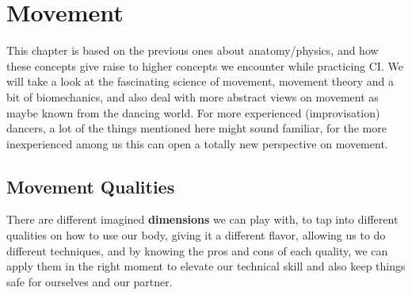 \chapter{Movement}\label{ch:movement}


This chapter is based on the previous ones about anatomy/physics, and how these concepts give raise to higher concepts we encounter while practicing CI\@.
We will take a look at the fascinating science of movement, movement theory and a bit of biomechanics, and also deal with more abstract views on movement as maybe known from the dancing world.
For more experienced (improvisation) dancers, a lot of the things mentioned here might sound familiar, for the more inexperienced among us this can open a totally new perspective on movement.

\section{Movement Qualities}\label{sec:movement-qualities}

There are different imagined \textbf{dimensions} we can play with, to tap into different qualities on how to use our body, giving it a different flavor, allowing us to do different techniques, and by knowing the pros and cons of each quality, we can apply them in the right moment to elevate our technical skill and also keep things safe for ourselves and our partner.


